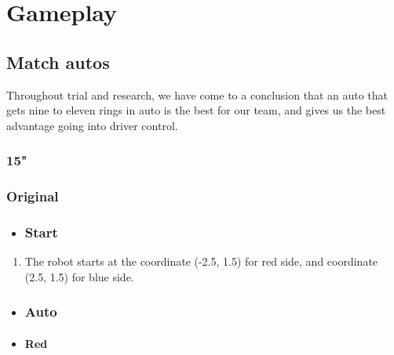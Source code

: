 \chapter{Gameplay}
\section{Match autos}
Throughout trial and research, we have come to a conclusion that an auto that gets nine to eleven rings in auto is the best for our team, and gives us the best advantage going into driver control.

\subsection{15"}

\subsection{Original}
\begin{itemize}
    \item \subsection{Start}
\end{itemize}
\begin{enumerate}
    \item The robot starts at the coordinate (-2.5, 1.5) for red side, and coordinate (2.5, 1.5) for blue side.
\end{enumerate}
\begin{itemize}
    \item \subsection{Auto}
    \item \subsubsection{Red}
\end{itemize}
